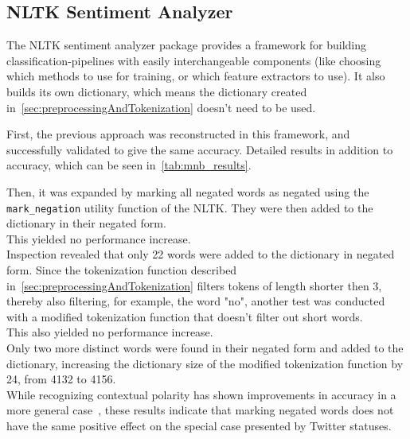 \subsection{NLTK Sentiment Analyzer}
\label{subsec:nltksentimentanalyzer}

The NLTK sentiment analyzer package provides a framework for building classification-pipelines with easily interchangeable components
(like choosing which methods to use for training, or which feature extractors to use).
It also builds its own dictionary, which means the dictionary created in~\ref{sec:preprocessingAndTokenization} doesn't need to be used.
\par
First, the previous approach was reconstructed in this framework, and successfully validated to give the same accuracy.
Detailed results in addition to accuracy, which can be seen in~\ref{tab:mnb_results}.

\begin{table}
    \caption{Sentiment classification using multinomial naive Bayes}
    \label{tab:mnb_results}
\end{table}

Then, it was expanded by marking all negated words as negated using the \texttt{mark_negation} utility function of the NLTK.
They were then added to the dictionary in their negated form.
\\
This yielded no performance increase.
\\
Inspection revealed that only 22 words were added to the dictionary in negated form.
Since the tokenization function described in~\ref{sec:preprocessingAndTokenization} filters tokens of length shorter then 3,
thereby also filtering, for example, the word "no", another test was conducted with a modified tokenization function that doesn't filter out short words.
\\
This also yielded no performance increase.
\\
Only two more distinct words were found in their negated form and added to the dictionary,
increasing the dictionary size of the modified tokenization function by 24, from 4132 to 4156.
\\
While recognizing contextual polarity has shown improvements in accuracy in a more general case~\cite{Hoffmann2005},
these results indicate that marking negated words does not have the same positive effect on the special case presented by Twitter statuses.

